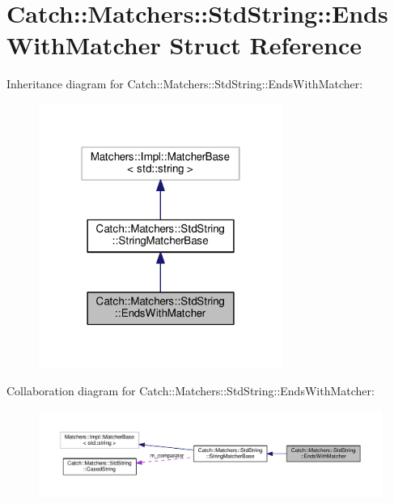 \hypertarget{structCatch_1_1Matchers_1_1StdString_1_1EndsWithMatcher}{}\section{Catch\+:\+:Matchers\+:\+:Std\+String\+:\+:Ends\+With\+Matcher Struct Reference}
\label{structCatch_1_1Matchers_1_1StdString_1_1EndsWithMatcher}


Inheritance diagram for Catch\+:\+:Matchers\+:\+:Std\+String\+:\+:Ends\+With\+Matcher\+:\nopagebreak
\begin{figure}[H]
\begin{center}
\leavevmode
\includegraphics[width=226pt]{structCatch_1_1Matchers_1_1StdString_1_1EndsWithMatcher__inherit__graph}
\end{center}
\end{figure}


Collaboration diagram for Catch\+:\+:Matchers\+:\+:Std\+String\+:\+:Ends\+With\+Matcher\+:\nopagebreak
\begin{figure}[H]
\begin{center}
\leavevmode
\includegraphics[width=350pt]{structCatch_1_1Matchers_1_1StdString_1_1EndsWithMatcher__coll__graph}
\end{center}
\end{figure}
